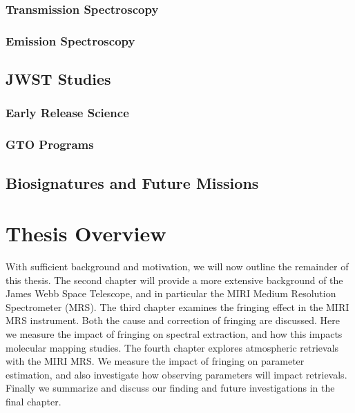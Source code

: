 \subsubsection{Transmission Spectroscopy}
\parencite{Kreidberg2018}
\parencite{Lee2012} %
\parencite{MacDonald2017} %
\parencite{Madhusudhan} %
\subsubsection{Emission Spectroscopy}
\parencite{Biller2018}
\parencite{Danielski2018}
\parencite{GRAVITYCollaboration2019}
\subsection{JWST Studies}
\parencite{Beichman2019} %
\subsubsection{Early Release Science}
\subsubsection{GTO Programs}
\subsection{Biosignatures and Future Missions}
\section{Thesis Overview}
With sufficient background and motivation, we will now outline the remainder of this thesis.
The second chapter will provide a more extensive background of the James Webb Space Telescope, and in particular the MIRI Medium Resolution Spectrometer (MRS).
The third chapter examines the fringing effect in the MIRI MRS instrument.
Both the cause and correction of fringing are discussed.
Here we measure the impact of fringing on spectral extraction, and how this impacts molecular mapping studies.
The fourth chapter explores atmospheric retrievals with the MIRI MRS.
We measure the impact of fringing on parameter estimation, and also investigate how observing parameters will impact retrievals.
Finally we summarize and discuss our finding and future investigations in the final chapter.

